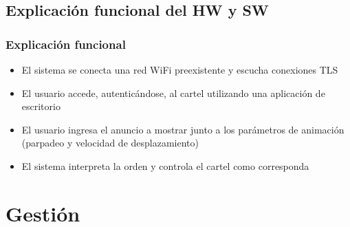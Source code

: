 \subsection{Explicación funcional del HW y SW}
\begin{frame}
	\frametitle{Explicación funcional}
	\begin{itemize}
		 \item El sistema se conecta una red WiFi preexistente y escucha conexiones TLS
		 \item El usuario accede, autenticándose, al cartel utilizando una aplicación de escritorio
		 \item El usuario ingresa el anuncio a mostrar junto a los parámetros de animación (parpadeo y velocidad de desplazamiento)
		 \item El sistema interpreta la orden y controla el cartel como corresponda
	\end{itemize}
	

\end{frame}

\section{Gestión}

